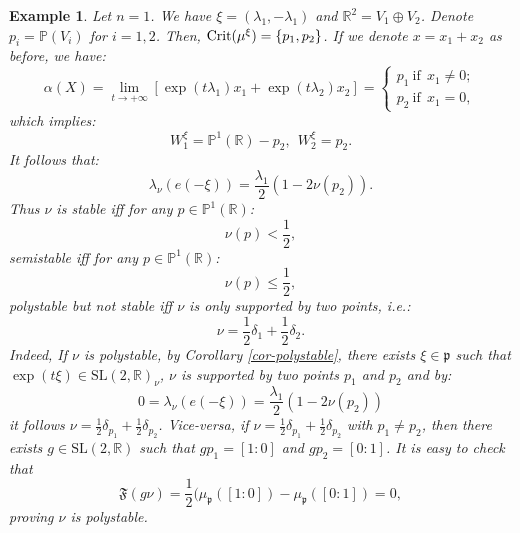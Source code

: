 \documentclass[leqno,11pt, a4]{amsart}
\newtheorem{Example}[equation]{Example}
\theoremstyle{named}
\begin{document}
\begin{Example}\rm
Let $n=1$.
We have $\xi=(\lambda_1,-\lambda_1)$ and $\mathds{R}^2=V_1\oplus V_2$.
Denote $p_i=\mathds{P}(V_i)$ for $i=1,2$. Then, ${\rm Crit}(\mu^\xi)=\{p_1,p_2 \}$. If {we denote $x=x_1+x_2$ as before, we have:
\begin{equation}
 {\alpha}(X) =\lim_{t\to +\infty} [\exp(t\lambda_1)x_1+\exp(t\lambda_{2})x_{2}]=\begin{cases} p_1\  {\textrm{if}}\ \ x_1\neq 0;\\
p_2 \  {\textrm{if}}\ \ x_1=0,
 \end{cases}\nonumber
\end{equation}
which implies:
$$
W_1^\xi=\mathds{P}^1(\mathds{R}){-} p_2,\ \  W_2^\xi=p_2.
$$
It follows that:
$$
\lambda_\nu(e(-\xi))=\frac{\lambda_1}2(1-2\nu (p_2)).
$$
Thus $\nu$ is stable iff for any $p\in \mathds{P}^1(\mathds{R})$:
$$
\nu (p)<\frac12,
$$
semistable iff for any $p\in \mathds{P}^1(\mathds{R})$:
$$
\nu (p)\leq \frac12,
$$
polystable but not stable  iff $\nu$ is only supported by two points, i.e.:
$$
\nu=\frac12 \delta_{1}+\frac12 \delta_{2}.
$$
Indeed, If $\nu$ is polystable, by Corollary \ref{cor-polystable}, there exists $\xi \in {\mathfrak{p}}$ such that $\exp(t\xi)\in \mathrm{SL}(2,{\mathbb{R}})_\nu$, $\nu$ is supported by two points $p_1$ and $p_2$ and by:
\[
0=\lambda_\nu(e(-\xi))=\frac{\lambda_1}2(1-2\nu (p_2))
\]
it follows $\nu=\frac12 \delta_{p_1}+\frac12 \delta_{p_2}$. Vice-versa, if $\nu=\frac12 \delta_{p_1}+\frac12 \delta_{p_2}$ with $p_1 \neq p_2$, then there exists $g\in \mathrm{SL}(2,{\mathbb{R}})$ such that $gp_1=[1:0]$ and $gp_2=[0:1]$. It is easy to check that
$$
{\mathfrak{F}} (g\nu)=\frac12({\mu_{\mathfrak{p}}}([1:0])-{\mu_{\mathfrak{p}}}([0:1])=0,
$$
proving $\nu$ is polystable.
}
\end{Example}
\end{document}
